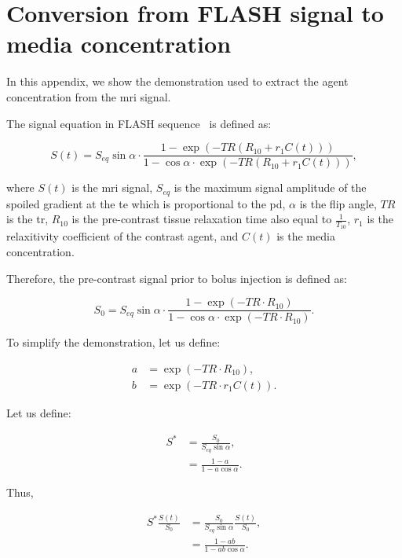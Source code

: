 \appendix
\section{Conversion from FLASH signal to media concentration}\label{app:signaltoconc}

In this appendix, we show the demonstration used to extract the agent concentration from the \ac{mri} signal.

The signal equation in FLASH sequence~\citep{haase1986flash} is defined as:

\begin{equation}
  S(t) = S_{eq} \sin \alpha \cdot \frac{1 - \exp\left(-TR\left(R_{10} + r_1 C(t)\right)\right)}{1 - \cos \alpha \cdot \exp\left(-TR\left(R_{10} + r_1 C(t)\right)\right)} ,
  \label{eq:app:flash}
\end{equation}

\noindent where $S(t)$ is the \ac{mri} signal, $S_{eq}$ is the maximum signal amplitude of the spoiled gradient at the \ac{te} which is proportional to the \ac{pd}, $\alpha$ is the flip angle, $TR$ is the \acf{tr}, $R_{10}$ is the pre-contrast tissue relaxation time also equal to $\frac{1}{T_{10}}$, $r_1$ is the relaxitivity coefficient of the contrast agent, and $C(t)$ is the media concentration.

Therefore, the pre-contrast signal prior to bolus injection is defined as:

\begin{equation}
  S_0 = S_{eq} \sin \alpha \cdot \frac{1 - \exp\left(-TR \cdot R_{10}\right)}{1 - \cos \alpha \cdot \exp\left(-TR \cdot R_{10}\right)} .
  \label{eq:app:precontrast}
\end{equation}

To simplify the demonstration, let us define:

\begin{align}
  a &= \exp(-TR \cdot R_{10}) , \\
  b &= \exp(-TR \cdot r_1 C(t)) .
\end{align}

Let us define:

\begin{align}
  S^{*} &= \frac{S_0}{S_{eq} \sin \alpha} , \\
  &= \frac{1 - a}{1 - a \cos \alpha} .
\end{align}

Thus,

\begin{align}
  S^{*}\frac{S(t)}{S_0} &= \frac{S_0}{S_{eq}\sin \alpha} \frac{S(t)}{S_0} , \\
  &= \frac{1 - a b}{1 - a b \cos \alpha} .
\end{align}


